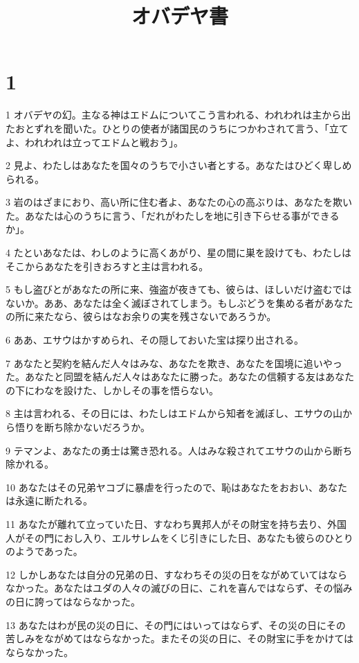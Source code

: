 

\title{オバデヤ書}


\chapter{1}

\par 1 オバデヤの幻。主なる神はエドムについてこう言われる、われわれは主から出たおとずれを聞いた。ひとりの使者が諸国民のうちにつかわされて言う、「立てよ、われわれは立ってエドムと戦おう」。
\par 2 見よ、わたしはあなたを国々のうちで小さい者とする。あなたはひどく卑しめられる。
\par 3 岩のはざまにおり、高い所に住む者よ、あなたの心の高ぶりは、あなたを欺いた。あなたは心のうちに言う、「だれがわたしを地に引き下らせる事ができるか」。
\par 4 たといあなたは、わしのように高くあがり、星の間に巣を設けても、わたしはそこからあなたを引きおろすと主は言われる。
\par 5 もし盗びとがあなたの所に来、強盗が夜きても、彼らは、ほしいだけ盗むではないか。ああ、あなたは全く滅ぼされてしまう。もしぶどうを集める者があなたの所に来たなら、彼らはなお余りの実を残さないであろうか。
\par 6 ああ、エサウはかすめられ、その隠しておいた宝は探り出される。
\par 7 あなたと契約を結んだ人々はみな、あなたを欺き、あなたを国境に追いやった。あなたと同盟を結んだ人々はあなたに勝った。あなたの信頼する友はあなたの下にわなを設けた、しかしその事を悟らない。
\par 8 主は言われる、その日には、わたしはエドムから知者を滅ぼし、エサウの山から悟りを断ち除かないだろうか。
\par 9 テマンよ、あなたの勇士は驚き恐れる。人はみな殺されてエサウの山から断ち除かれる。
\par 10 あなたはその兄弟ヤコブに暴虐を行ったので、恥はあなたをおおい、あなたは永遠に断たれる。
\par 11 あなたが離れて立っていた日、すなわち異邦人がその財宝を持ち去り、外国人がその門におし入り、エルサレムをくじ引きにした日、あなたも彼らのひとりのようであった。
\par 12 しかしあなたは自分の兄弟の日、すなわちその災の日をながめていてはならなかった。あなたはユダの人々の滅びの日に、これを喜んではならず、その悩みの日に誇ってはならなかった。
\par 13 あなたはわが民の災の日に、その門にはいってはならず、その災の日にその苦しみをながめてはならなかった。またその災の日に、その財宝に手をかけてはならなかった。
